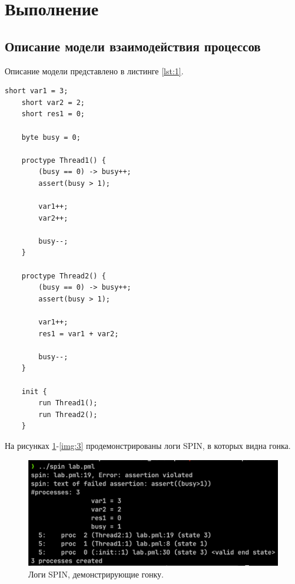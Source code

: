 \section{Выполнение}

\subsection{Описание модели взаимодействия процессов}

Описание модели представлено в листинге \ref{lst:1}.

\begin{lstlisting}[label=lst:1,caption=Описание модели взаимодействия процессов.]
	short var1 = 3;
	short var2 = 2;
	short res1 = 0;

	byte busy = 0;

	proctype Thread1() {
		(busy == 0) -> busy++;
		assert(busy > 1);

		var1++;
		var2++;

		busy--;
	}

	proctype Thread2() {
		(busy == 0) -> busy++;
		assert(busy > 1);
		
		var1++;
		res1 = var1 + var2;

		busy--;
	}

	init {
		run Thread1();
		run Thread2();
	}
\end{lstlisting}

На рисунках \ref{img:1}-\ref{img:3} продемонстрированы логи SPIN, в которых видна гонка.

\begin{figure}[H]
	\centering
	\includegraphics[width=\textwidth]{inc/1.png}
	\caption{ Логи SPIN, демонстрирующие гонку. }
	\label{img:1}
\end{figure}

